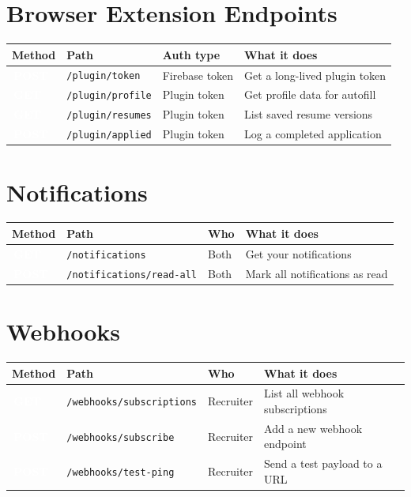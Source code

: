 \documentclass[12pt, a4paper]{report}
\newcommand{\code}[1]{\texttt{\small #1}}
\newcommand{\badge}[2]{%
  \colorbox{#1}{\textcolor{white}{\tiny\bfseries\,#2\,}}%
}
\newcommand{\GET}{\badge{successgr}{GET}}
\newcommand{\POST}{\badge{infoblue}{POST}}
\begin{document}
{%
\section{Browser Extension Endpoints}

\begin{longtable}{p{1.5cm}p{5.5cm}p{2.5cm}p{5.2cm}}
\toprule
\textbf{Method} & \textbf{Path} & \textbf{Auth type} & \textbf{What it does} \\
\midrule
\endhead
\POST & \code{/plugin/token}   & Firebase token  & Get a long-lived plugin token \\
\GET  & \code{/plugin/profile} & Plugin token    & Get profile data for autofill \\
\GET  & \code{/plugin/resumes} & Plugin token    & List saved resume versions \\
\POST & \code{/plugin/applied} & Plugin token    & Log a completed application \\
\bottomrule
\end{longtable}

\section{Notifications}

\begin{longtable}{p{1.5cm}p{5.5cm}p{2.2cm}p{5.5cm}}
\toprule
\textbf{Method} & \textbf{Path} & \textbf{Who} & \textbf{What it does} \\
\midrule
\endhead
\GET  & \code{/notifications}          & Both & Get your notifications \\
\POST & \code{/notifications/read-all} & Both & Mark all notifications as read \\
\bottomrule
\end{longtable}

\section{Webhooks}

\begin{longtable}{p{1.5cm}p{5.5cm}p{2.2cm}p{5.5cm}}
\toprule
\textbf{Method} & \textbf{Path} & \textbf{Who} & \textbf{What it does} \\
\midrule
\endhead
\GET  & \code{/webhooks/subscriptions} & Recruiter & List all webhook subscriptions \\
\POST & \code{/webhooks/subscribe}     & Recruiter & Add a new webhook endpoint \\
\POST & \code{/webhooks/test-ping}     & Recruiter & Send a test payload to a URL \\
\bottomrule
\end{longtable}

}
\end{document}
